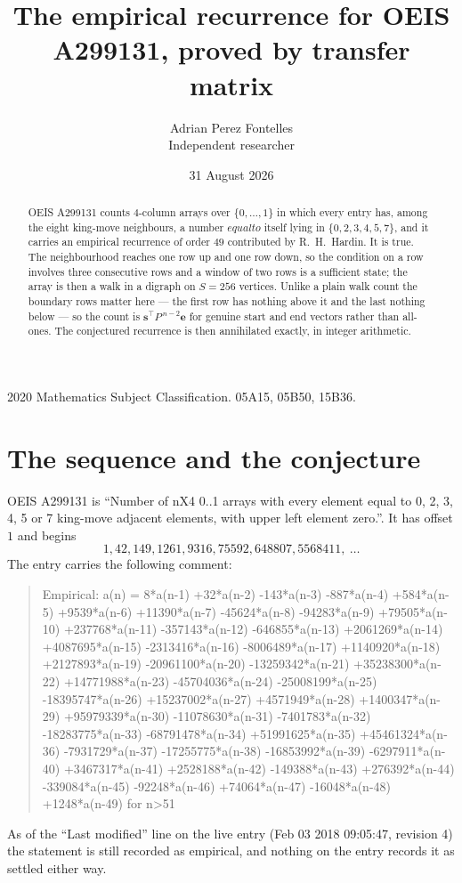 \documentclass[11pt,a4paper]{article}
\title{The empirical recurrence for OEIS A299131, proved by transfer matrix}
\author{Adrian Perez Fontelles\\ \small Independent researcher}
\date{31 August 2026}
\theoremstyle{plain}
\theoremstyle{definition}
\begin{document}
\maketitle

\begin{abstract}
OEIS A299131 counts $4$-column arrays over $\{0,\dots,1\}$ in which every entry has,
among the eight king-move neighbours, a number $equal to$ itself lying in $\{0,2,3,4,5,7\}$, and it carries an empirical
recurrence of order $49$ contributed by R.~H.~Hardin. It is true. The neighbourhood
reaches one row up and one row down, so the condition on a row involves three consecutive
rows and a window of two rows is a sufficient state; the array is then a walk in a digraph
on $S=256$ vertices. Unlike a plain walk count the boundary rows matter here --- the first
row has nothing above it and the last nothing below --- so the count is
$\mathbf{s}^{\!\top}P^{\,n-2}\mathbf{e}$ for genuine start and end vectors rather than
all-ones. The conjectured recurrence is then annihilated exactly, in integer arithmetic.
\end{abstract}

\noindent\small 2020 Mathematics Subject Classification. 05A15, 05B50, 15B36.\normalsize

\section{The sequence and the conjecture}

OEIS A299131 is ``Number of nX4 0..1 arrays with every element equal to 0, 2, 3, 4, 5 or 7 king-move adjacent elements, with upper left element zero.''. It has offset
$1$ and begins
\[
1, 42, 149, 1261, 9316, 75592, 648807, 5568411,\ \dots
\]
The entry carries the following comment:
\begin{quote}\small
Empirical: a(n) = 8*a(n-1) +32*a(n-2) -143*a(n-3) -887*a(n-4) +584*a(n-5) +9539*a(n-6) +11390*a(n-7) -45624*a(n-8) -94283*a(n-9) +79505*a(n-10) +237768*a(n-11) -357143*a(n-12) -646855*a(n-13) +2061269*a(n-14) +4087695*a(n-15) -2313416*a(n-16) -8006489*a(n-17) +1140920*a(n-18) +2127893*a(n-19) -20961100*a(n-20) -13259342*a(n-21) +35238300*a(n-22) +14771988*a(n-23) -45704036*a(n-24) -25008199*a(n-25) -18395747*a(n-26) +15237002*a(n-27) +4571949*a(n-28) +1400347*a(n-29) +95979339*a(n-30) -11078630*a(n-31) -7401783*a(n-32) -18283775*a(n-33) -68791478*a(n-34) +51991625*a(n-35) +45461324*a(n-36) -7931729*a(n-37) -17255775*a(n-38) -16853992*a(n-39) -6297911*a(n-40) +3467317*a(n-41) +2528188*a(n-42) -149388*a(n-43) +276392*a(n-44) -339084*a(n-45) -92248*a(n-46) +74064*a(n-47) -16048*a(n-48) +1248*a(n-49) for n>51
\end{quote}
As of the ``Last modified'' line on the live entry (Feb 03 2018 09:05:47, revision
4) the statement is still recorded as empirical, and nothing on the entry
records it as settled either way.
\end{document}
